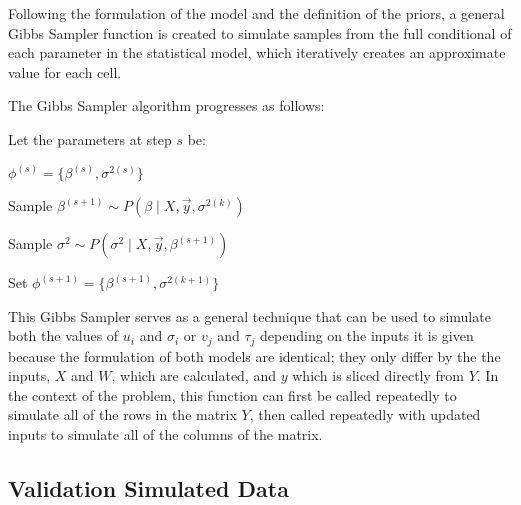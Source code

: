 \documentclass[12pt,twoside]{dukestatscithesis}
\theoremstyle{definition}
\theoremstyle{definition}
\theoremstyle{definition}
\theoremstyle{remark}
\begin{document}
Following the formulation of the model and the definition of the priors,
a general Gibbs Sampler function is created to simulate samples from the
full conditional of each parameter in the statistical model, which
iteratively creates an approximate value for each cell.

The Gibbs Sampler algorithm progresses as follows:

Let the parameters at step \(s\) be:

\(\phi^{(s)} = \{\beta^{(s)}, \sigma^{2(s)}\}\)

Sample \(\beta^{(s+1)} \sim P(\beta \mid X, \vec{y}, \sigma^{2(k)})\)

Sample \(\sigma^2 \sim P(\sigma^2 \mid X, \vec{y}, \beta^{(s+1)})\)

Set \(\phi^{(s+1)} = \{\beta^{(s+1)}, \sigma^{2(k+1)}\}\)

This Gibbs Sampler serves as a general technique that can be used to
simulate both the values of \(u_i\) and \(\sigma_i\) or \(v_j\) and
\(\tau_j\) depending on the inputs it is given because the formulation
of both models are identical; they only differ by the the inputs, \(X\)
and \(W\), which are calculated, and \(y\) which is sliced directly from
\(Y\). In the context of the problem, this function can first be called
repeatedly to simulate all of the rows in the matrix \(Y\), then called
repeatedly with updated inputs to simulate all of the columns of the
matrix.

\subsection{Validation Simulated Data}\label{validation-simulated-data}
\end{document}

